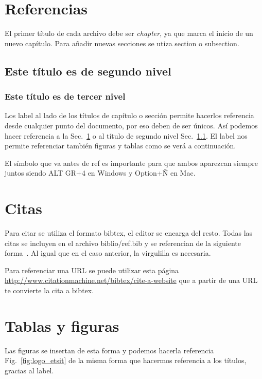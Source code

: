 \section{Referencias}\label{sec:primero}

El primer título de cada archivo debe ser \textit{chapter}, ya que marca el inicio de un nuevo capítulo. Para añadir nuevas secciones se utiza section o subsection.

\subsection{Este título es de segundo nivel} \label{sec:segundo}

\subsubsection{Este título es de tercer nivel} \label{sec:tercero} %

Los label al lado de los títulos de capítulo o sección permite hacerlos referencia desde cualquier punto del documento, por eso deben de ser únicos. Así podemos hacer referencia a la Sec.~\ref{sec:primero} o al título de segundo nivel Sec.~\ref{sec:segundo}. El label nos permite referenciar también figuras y tablas como se verá a continuación.

El símbolo que va antes de ref es importante para que ambos aparezcan siempre juntos siendo ALT GR+4 en Windows y Option+Ñ en Mac.

\section{Citas} \label{sec:cites}

Para citar se utiliza el formato bibtex, el editor se encarga del resto. Todas las citas se incluyen en el archivo biblio/ref.bib y se referencian de la siguiente forma~\cite{ghemawat2003google}. Al igual que en el caso anterior, la virgulilla es necesaria.

Para referenciar una URL se puede utilizar esta página \url{http://www.citationmachine.net/bibtex/cite-a-website} que a partir de una URL te convierte la cita a bibtex.

\section{Tablas y figuras} \label{sec:tablasyfiguras}

Las figuras se insertan  de esta forma y podemos hacerla referencia Fig.~\ref{fig:logo_etsit} de la misma forma que hacermos referencia a los títulos, gracias al label.

